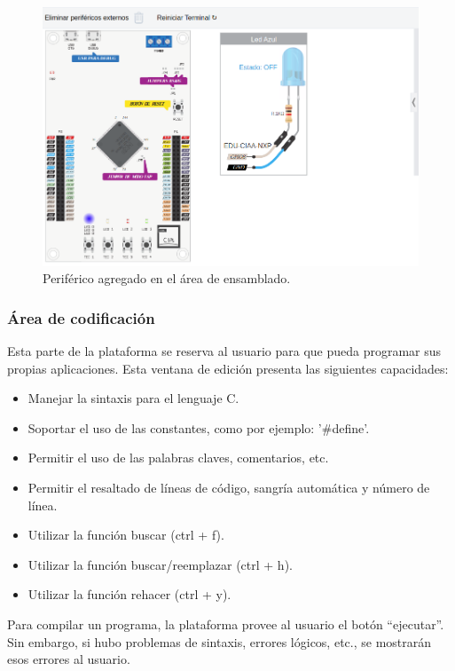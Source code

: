 \begin{figure}[ht]
	\centering
	\includegraphics[scale=.37]{./Figures/AgregarPeriferico2.png}
	\caption{Periférico agregado en el área de ensamblado. }
	\label{fig:AgregarPeriferico2}
\end{figure}

\hfill \break
\hfill \break
\hfill \break

\subsubsection{Área de codificación}

Esta parte de la plataforma se reserva al usuario para que pueda programar sus propias aplicaciones. Esta ventana de edición presenta las siguientes capacidades:

\begin{itemize}
\item Manejar la sintaxis para el lenguaje C.
\item Soportar el uso de las constantes, como por ejemplo: '\#define'.
\item Permitir el uso de las palabras claves, comentarios, etc.
\item Permitir el resaltado de líneas de código, sangría automática y número de línea.
\item Utilizar la función buscar (ctrl + f).
\item Utilizar la función buscar/reemplazar (ctrl + h).
\item Utilizar la función rehacer (ctrl + y).
\end{itemize}


Para compilar un programa, la plataforma provee al usuario el botón “ejecutar”. Sin embargo, si hubo problemas de sintaxis, errores lógicos, etc., se mostrarán esos errores al usuario.

